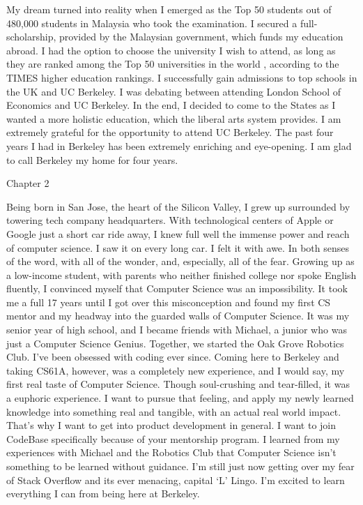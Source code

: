 \documentclass{article}
\begin{document}
My dream turned into reality when I emerged as the Top 50 students out of 480,000 students in Malaysia who took the examination. I secured a full-scholarship, provided by the Malaysian government, which funds my education abroad. I had the option to choose the university I wish to attend, as long as they are ranked among the Top 50 universities in the world , according to the TIMES higher education rankings. I successfully gain admissions to top schools in the UK and UC Berkeley. I was debating between attending London School of Economics and UC Berkeley. In the end, I decided to come to the States as I wanted a more holistic education, which the liberal arts system provides. I am extremely grateful for the opportunity to attend UC Berkeley. The past four years I had in Berkeley has been extremely enriching and eye-opening. I am glad to call Berkeley my home for four years. 


Chapter 2

Being born in San Jose, the heart of the Silicon Valley, I grew up surrounded by towering tech company headquarters. With technological centers of Apple or Google just a short car ride away, I knew full well  the immense power and reach of computer science. I saw it on every long car. I felt it with awe. In both senses of the word, with all of the wonder, and, especially, all of the fear. Growing up as a low-income student, with parents who neither finished college nor spoke English fluently, I convinced myself that Computer Science was an impossibility. It took me a full 17 years until I got over this misconception and found my first CS mentor and my headway into the guarded walls of Computer Science. It was my senior year of high school, and I became friends with Michael, a junior who was just a Computer Science Genius. Together, we started the Oak Grove Robotics Club. I’ve been obsessed with coding ever since. Coming here to Berkeley and taking CS61A, however, was a completely new experience, and I would say, my first real taste of Computer Science. Though soul-crushing and tear-filled, it was a euphoric experience. I want to pursue that feeling, and apply my newly learned knowledge into something real and tangible, with an actual real world impact. That’s why I want to get into product development in general. I want to join CodeBase specifically because of your mentorship program. I learned from my experiences with Michael and the Robotics Club that Computer Science isn’t something to be learned without guidance. I’m still just now getting over my fear of Stack Overflow and its ever menacing, capital ‘L’ Lingo. I'm excited to learn everything I can from being here at Berkeley.
\end{document}
